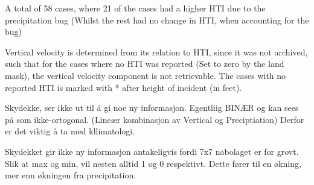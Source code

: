 A total of 58 cases, where 21 of the cases had a higher HTI due to the precipitation bug (Whilst the rest had no change in HTI, when accounting for the bug)

Vertical velocity is determined from its relation to HTI, since it was not archived, such that for the cases where no HTI was reported (Set to zero by the land mask), the vertical velocity component is not retrievable. The cases with no reported HTI is marked with * after height of incident (in feet).

Skydekke, ser ikke ut til å gi noe ny informasjon. Egentliig BINÆR og kan sees på som ikke-ortogonal. (Lineær kombinasjon av Vertical og Preciptiation) Derfor er det viktig å ta med kllimatologi.

Skydekket gir ikke ny informasjon antakeligvis fordi 7x7 nabolaget er for grovt. Slik at max og min, vil nesten alltid 1 og 0 respektivt. Dette fører til en økning, mer enn økningen fra precipitation.

